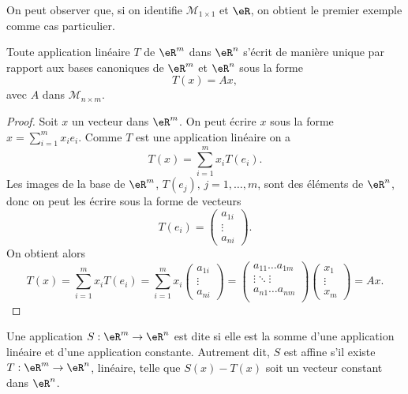 On peut observer que, si on identifie $\mathcal{M}_{1\times 1}$ et $\eR$, on obtient le premier exemple comme cas particulier.

\begin{proposition}
 Toute application linéaire $T$ de $\eR^m$ dans $\eR^n$ s'écrit de manière unique par rapport aux bases canoniques de $\eR^m$ et $\eR^n$ sous la forme
\[
T(x)=Ax,
\]
avec $A$ dans $\mathcal{M}_{n\times m}$.
\end{proposition}

\begin{proof}
  Soit $x$ un vecteur dans $\eR^m$. On peut écrire $x$ sous la forme $ x=\sum_{i=1}^{m}x_i e_i$. Comme $T$ est une application linéaire on a
\[
T(x)=\sum_{i=1}^{m}x_iT(e_i).
\]
Les images de la base de $\eR^m$, $T(e_j), \, j=1,\ldots,m$, sont des éléments de $\eR^n$, donc on peut les écrire sous la forme de vecteurs
\[
T(e_i)=
\begin{pmatrix}
  a_{1i}\\
\vdots\\
a_{ni}
\end{pmatrix}.
\] 
On obtient alors
\[
T(x)=\sum_{i=1}^{m}x_iT(e_i)=\sum_{i=1}^{m}x_i\begin{pmatrix}
  a_{1i}\\
\vdots\\
a_{ni}
\end{pmatrix}=
\begin{pmatrix}
  a_{11} \ldots a_{1m}\\
\vdots \ddots \vdots\\
 a_{n1} \ldots a_{nm}\\
\end{pmatrix}
\begin{pmatrix}
  x_1\\
\vdots\\
x_m
\end{pmatrix}=Ax.
\]
\end{proof}

\begin{definition}
  Une application $S: \eR^m\to\eR^n$ est dite  si elle est la somme d'une application linéaire et d'une application constante. Autrement dit, $S$ est affine s'il existe $T: \eR^m\to\eR^n$, linéaire, telle que $S(x)-T(x)$ soit un vecteur constant dans $\eR^n$. 
\end{definition}

